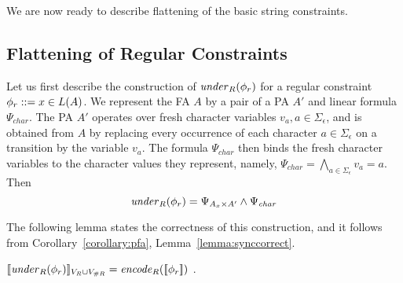 \documentclass[sigplan,review,anonymous]{acmart}\settopmatter{printfolios=true,printccs=false,printacmref=false}
\begin{document}
We are now ready to describe flattening of the basic string constraints.


\subsection{Flattening of Regular Constraints} \label{section:mem}

Let us first describe the construction of $\mathit{under}_R(\phi_r)$ for a regular constraint $\phi_r ::= x \in L(A)$. 
We represent the FA $A$ by a pair of a PA $A'$ and linear formula $\Psi_{\mathit{char}}$. 
The PA $A'$ operates over fresh character variables $v_a, a\in\Sigma_\epsilon$, and is obtained from $A$ by replacing every occurrence of each character $a\in\Sigma_{\epsilon}$ on a transition by the variable $v_a$. 
The formula $\Psi_{\mathit{char}}$ then binds the fresh character variables to the character values they represent, 
namely, $\Psi_{\mathit{char}} = \bigwedge_{a\in\Sigma_\epsilon} v_a = a$.
Then 
$$\mathit{under}_R(\phi_r) = \Psi_{A_x \times A'} \land \Psi_{\mathit{char}}$$ 

The following lemma states the correctness of this construction, and it follows from Corollary~\ref{corollary:pfa}, Lemma~\ref{lemma:synccorrect}. 
\begin{lemma}\label{lemma:memcorrect} $[\![\mathit{under}_R(\phi_r)]\!]_{V_R \cup V_{\#R}} = \mathit{encode}_{R} ([\![\phi_r]\!])$ . 
\end{lemma}
\end{document}
